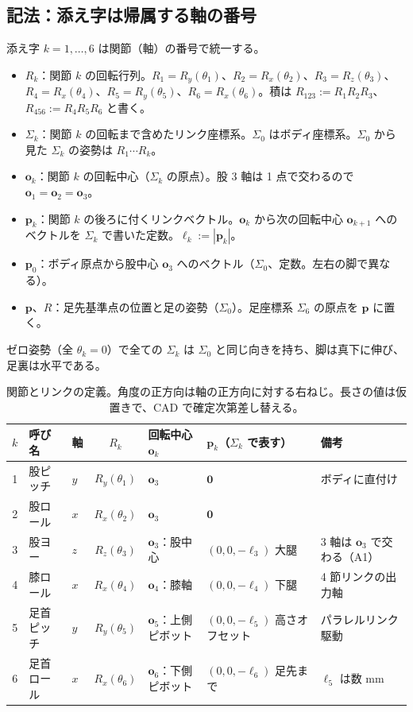 \documentclass[a4paper,11pt]{ltjsarticle}
\newcommand{\Rx}{R_x}\newcommand{\Ry}{R_y}\newcommand{\Rz}{R_z}
\newcommand{\bp}{\boldsymbol{p}}\newcommand{\bo}{\boldsymbol{o}}\newcommand{\br}{\boldsymbol{r}}
\begin{document}
\subsection{記法：添え字は帰属する軸の番号}
添え字 $k=1,\dots,6$ は関節（軸）の番号で統一する。
\begin{itemize}
\item $R_k$：関節 $k$ の回転行列。$R_1=\Ry(\theta_1)$、$R_2=\Rx(\theta_2)$、$R_3=\Rz(\theta_3)$、$R_4=\Rx(\theta_4)$、$R_5=\Ry(\theta_5)$、$R_6=\Rx(\theta_6)$。積は $R_{123}:=R_1R_2R_3$、$R_{456}:=R_4R_5R_6$ と書く。
\item $\Sigma_k$：関節 $k$ の回転まで含めたリンク座標系。$\Sigma_0$ はボディ座標系。$\Sigma_0$ から見た $\Sigma_k$ の姿勢は $R_1\cdots R_k$。
\item $\bo_k$：関節 $k$ の回転中心（$\Sigma_k$ の原点）。股 3 軸は 1 点で交わるので $\bo_1=\bo_2=\bo_3$。
\item $\bp_k$：関節 $k$ の後ろに付くリンクベクトル。$\bo_k$ から次の回転中心 $\bo_{k+1}$ へのベクトルを $\Sigma_k$ で書いた定数。$\ell_k:=|\bp_k|$。
\item $\bp_0$：ボディ原点から股中心 $\bo_3$ へのベクトル（$\Sigma_0$、定数。左右の脚で異なる）。
\item $\bp$、$R$：足先基準点の位置と足の姿勢（$\Sigma_0$）。足座標系 $\Sigma_6$ の原点を $\bp$ に置く。
\end{itemize}
ゼロ姿勢（全 $\theta_k=0$）で全ての $\Sigma_k$ は $\Sigma_0$ と同じ向きを持ち、脚は真下に伸び、足裏は水平である。

\begin{table}[htbp]
\centering
\caption{関節とリンクの定義。角度の正方向は軸の正方向に対する右ねじ。長さの値は仮置きで、CAD で確定次第差し替える。}
\label{tab:joints}
\small
\begin{tabular}{cllclll}
\toprule
$k$ & 呼び名 & 軸 & $R_k$ & 回転中心 $\bo_k$ & $\bp_k$（$\Sigma_k$ で表す） & 備考\\
\midrule
1 & 股ピッチ & $y$ & $\Ry(\theta_1)$ & $\bo_3$ & $\boldsymbol 0$ & ボディに直付け\\
2 & 股ロール & $x$ & $\Rx(\theta_2)$ & $\bo_3$ & $\boldsymbol 0$ & \\
3 & 股ヨー & $z$ & $\Rz(\theta_3)$ & $\bo_3$：股中心 & $(0,0,-\ell_3)$ 大腿 & 3 軸は $\bo_3$ で交わる（A1）\\
4 & 膝ロール & $x$ & $\Rx(\theta_4)$ & $\bo_4$：膝軸 & $(0,0,-\ell_4)$ 下腿 & 4 節リンクの出力軸\\
5 & 足首ピッチ & $y$ & $\Ry(\theta_5)$ & $\bo_5$：上側ピボット & $(0,0,-\ell_5)$ 高さオフセット & パラレルリンク駆動\\
6 & 足首ロール & $x$ & $\Rx(\theta_6)$ & $\bo_6$：下側ピボット & $(0,0,-\ell_6)$ 足先まで & $\ell_5$ は数 mm\\
\bottomrule
\end{tabular}
\end{table}
\end{document}
